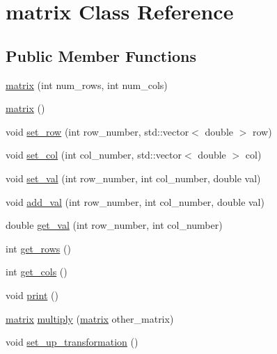 \hypertarget{classmatrix}{}\section{matrix Class Reference}
\label{classmatrix}
\subsection*{Public Member Functions}
\begin{DoxyCompactItemize}
\item 
\mbox{\hyperlink{classmatrix_a2994d419451e97702e5b1cc12c81d914}{matrix}} (int num\+\_\+rows, int num\+\_\+cols)
\item 
\mbox{\hyperlink{classmatrix_a4daf70b1506ea976352f20e4322a9c17}{matrix}} ()
\item 
void \mbox{\hyperlink{classmatrix_a2e865089f895c8a84c37818cf75ca215}{set\+\_\+row}} (int row\+\_\+number, std\+::vector$<$ double $>$ row)
\item 
void \mbox{\hyperlink{classmatrix_a976c7dba1c9f40d6c129067fd4c5afc1}{set\+\_\+col}} (int col\+\_\+number, std\+::vector$<$ double $>$ col)
\item 
void \mbox{\hyperlink{classmatrix_a761067e4f67f5b9c23594cbc1d8ce696}{set\+\_\+val}} (int row\+\_\+number, int col\+\_\+number, double val)
\item 
void \mbox{\hyperlink{classmatrix_ae9817c7c1a8855874728c2342f514885}{add\+\_\+val}} (int row\+\_\+number, int col\+\_\+number, double val)
\item 
double \mbox{\hyperlink{classmatrix_a4913d355d918c769b200cc0b6bffbd68}{get\+\_\+val}} (int row\+\_\+number, int col\+\_\+number)
\item 
int \mbox{\hyperlink{classmatrix_a528d089b9734f7cda64ffab3a2d2831f}{get\+\_\+rows}} ()
\item 
int \mbox{\hyperlink{classmatrix_ae8479003bb1373c0f27f7f59980d5e3a}{get\+\_\+cols}} ()
\item 
void \mbox{\hyperlink{classmatrix_a820379d929b5a1c49c9df0d05f91c7e2}{print}} ()
\item 
\mbox{\hyperlink{classmatrix}{matrix}} \mbox{\hyperlink{classmatrix_a34563095940d2be0e50d98fbb2ba9ead}{multiply}} (\mbox{\hyperlink{classmatrix}{matrix}} other\+\_\+matrix)
\item 
void \mbox{\hyperlink{classmatrix_a159c12c74a7a58596e297a29094eb1f9}{set\+\_\+up\+\_\+transformation}} ()
\end{DoxyCompactItemize}


